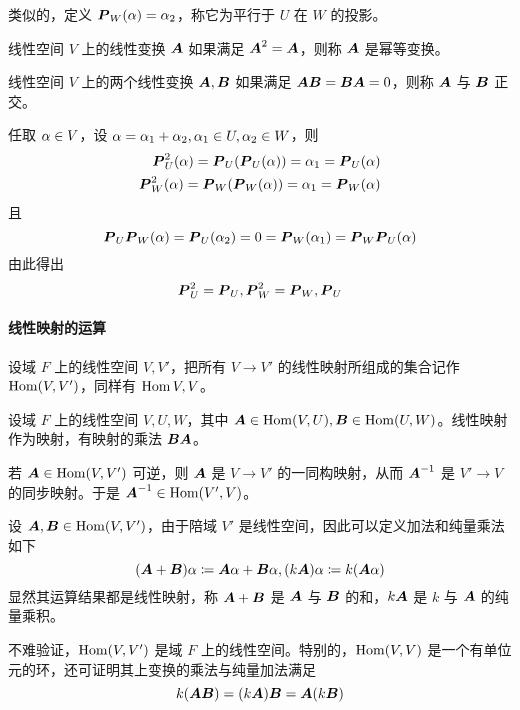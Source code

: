 类似的，定义 $\boldsymbol{P}_W(\alpha) = \alpha_2$，称它为平行于 $U$ 在 $W$ 的投影。

\begin{definition}[幂等变换]
    线性空间 $V$ 上的线性变换 $\boldsymbol{A}$ 如果满足 $\boldsymbol{A}^2 = \boldsymbol{A}$，则称 $\boldsymbol{A}$ 是幂等变换。
\end{definition}

\begin{definition}
    线性空间 $V$ 上的两个线性变换 $\boldsymbol{A}, \boldsymbol{B}$ 如果满足 $\boldsymbol{A}\boldsymbol{B} = \boldsymbol{B}\boldsymbol{A} = 0$，则称 $\boldsymbol{A}$ 与 $\boldsymbol{B}$ 正交。
\end{definition}

任取 $\alpha\in V$，设 $\alpha = \alpha_1 + \alpha_2, \alpha_1 \in U, \alpha_2 \in W$，则
\begin{equation*}
    \begin{aligned}
        \boldsymbol{P}_U^2(\alpha) = \boldsymbol{P}_U(\boldsymbol{P}_U(\alpha)) = \alpha_1 = \boldsymbol{P}_U(\alpha)\\
        \boldsymbol{P}_W^2(\alpha) = \boldsymbol{P}_W(\boldsymbol{P}_W(\alpha)) = \alpha_1 = \boldsymbol{P}_W(\alpha)
    \end{aligned}
\end{equation*}
且
\[ \boldsymbol{P}_U\boldsymbol{P}_W(\alpha) = \boldsymbol{P}_U(\alpha_2) = 0 = \boldsymbol{P}_W(\alpha_1) = \boldsymbol{P}_W\boldsymbol{P}_U(\alpha) \]
由此得出
\[ \boldsymbol{P}_U^2 = \boldsymbol{P}_U, \boldsymbol{P}_W^2 = \boldsymbol{P}_W, \boldsymbol{P}_U \]

\paragraph{线性映射的运算}

设域 $F$ 上的线性空间 $V,V'$，把所有 $V \to V'$ 的线性映射所组成的集合记作 $\operatorname{Hom}(V,V')$，同样有 $\operatorname{Hom}{V,V}$。

设域 $F$ 上的线性空间 $V,U,W$，其中 $\boldsymbol{A} \in \operatorname{Hom}(V,U), \boldsymbol{B} \in \operatorname{Hom}(U,W)$。线性映射作为映射，有映射的乘法 $\boldsymbol{B}\boldsymbol{A}$。

若 $\boldsymbol{A}\in \operatorname{Hom}(V,V')$ 可逆，则 $\boldsymbol{A}$ 是 $V \to V'$ 的一同构映射，从而 $\boldsymbol{A}^{-1}$ 是 $V' \to V$ 的同步映射。于是 $\boldsymbol{A}^{-1} \in \operatorname{Hom}(V',V)$。

设 $\boldsymbol{A},\boldsymbol{B} \in \operatorname{Hom} (V,V')$，由于陪域 $V'$ 是线性空间，因此可以定义加法和纯量乘法如下
\[ (\boldsymbol{A} + \boldsymbol{B}) \alpha \coloneqq \boldsymbol{A}\alpha + \boldsymbol{B}\alpha, (k\boldsymbol{A})\alpha \coloneqq k(\boldsymbol{A} \alpha) \]
显然其运算结果都是线性映射，称 $\boldsymbol{A} + \boldsymbol{B}$ 是 $\boldsymbol{A}$ 与 $\boldsymbol{B}$ 的和，$k\boldsymbol{A}$ 是 $k$ 与 $\boldsymbol{A}$ 的纯量乘积。

不难验证，$\operatorname{Hom}(V,V')$ 是域 $F$ 上的线性空间。特别的，$\operatorname{Hom}(V,V)$ 是一个有单位元的环，还可证明其上变换的乘法与纯量加法满足
\[ k(\boldsymbol{A}\boldsymbol{B}) = (k\boldsymbol{A})\boldsymbol{B} = \boldsymbol{A}(k\boldsymbol{B}) \]

